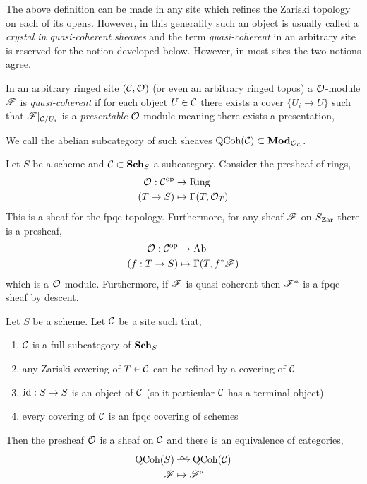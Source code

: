 \documentclass[12pt]{article}
\begin{document}
\begin{rmk}
The above definition can be made in any site which refines the Zariski topology on each of its opens. However, in this generality such an object is usually called a \textit{crystal in quasi-coherent sheaves} and the term \textit{quasi-coherent} in an arbitrary site is reserved for the notion developed below. However, in most sites the two notions agree.
\end{rmk}


\begin{defn}
In an arbitrary ringed site $(\mathcal{C}, \mathcal{O}_{})$ (or even an arbitrary ringed topos) a $\mathcal{O}_{}$-module $\mathscr{F}$ is \textit{quasi-coherent} if for each object $U \in \mathcal{C}$ there exists a cover $\{ U_i \to U \}$ such that $\mathscr{F}|_{\mathcal{C} / U_i}$ is a \textit{presentable} $\mathcal{O}_{}$-module meaning there exists a presentation,
\begin{center}
\end{center}
We call the abelian subcategory of such sheaves $\mathrm{QCoh}(\mathcal{C}) \subset \mathbf{Mod}_{\mathcal{O}_{\mathcal{C}}}$.
\end{defn}

\begin{defn}
Let $S$ be a scheme and $\mathcal{C} \subset \mathbf{Sch}_S$ a subcategory. Consider the presheaf of rings,
\begin{align*}
\mathcal{O}_{} : \mathcal{C}^{\mathrm{op}} & \to \mathrm{Ring}
\\
(T \to S)  & \mapsto \Gamma(T, \mathcal{O}_{T}) 
\end{align*}
This is a sheaf for the fpqc topology. Furthermore, for any sheaf $\mathscr{F}$ on $S_{\mathrm{Zar}}$ there is a presheaf,
\begin{align*}
\mathcal{O}_{} : \mathcal{C}^{\mathrm{op}} & \to \mathrm{Ab}
\\
(f : T \to S) & \mapsto \Gamma(T, f^* \mathscr{F})
\end{align*} 
which is a $\mathcal{O}_{}$-module. Furthermore, if $\mathscr{F}$ is quasi-coherent then $\mathscr{F}^a$ is a fpqc sheaf by descent.
\end{defn}

\begin{theorem}
Let $S$ be a scheme. Let $\mathcal{C}$ be a site such that,
\begin{enumerate}
\item $\mathcal{C}$ is a full subcategory of $\mathbf{Sch}_S$
\item any Zariski covering of $T \in \mathcal{C}$ can be refined by a covering of $\mathcal{C}$
\item $\mathrm{id} : S \to S$ is an object of $\mathcal{C}$ (so it particular $\mathcal{C}$ has a terminal object)
\item every covering of $\mathcal{C}$ is an fpqc covering of schemes
\end{enumerate}
Then the presheaf $\mathcal{O}_{}$ is a sheaf on $\mathcal{C}$ and there is an equivalence of categories,
\begin{align*}
\QCoh(S) & \iso \QCoh(\C)
\\
\F & \mapsto \F^a
\end{align*}
\end{theorem}
\end{document}
